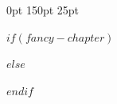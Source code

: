 \usepackage{ragged2e}
\usepackage{quoting}

\newenvironment{raggedrighttitle}[1][3cm]
  {\begin{quoting}[leftmargin=#1,rightmargin=#1]\RaggedRight}
  {\end{quoting}}

\renewcommand{\thesection}{}

\titlespacing*{\chapter}
{0pt}%
{150pt}%
{25pt}%

$if(fancy-chapter)$
  \usepackage[$fancy-chapter$]{fncychap}
$else$
  
$endif$

\makeatletter
\let\fp@chapter\chapter
\renewcommand{\chapter}{\fp@chapterimage\@ifstar{\fp@starchapter}{\@ifnextchar[{\fp@chapter}{\fp@numberedchapter}}}
\newcommand{\fp@starchapter}[1]{\fp@chapter*{#1\fp@subtitleline{#1}}\markboth{#1}{}\gdef\fp@subtitle{}}

\newcommand{\fp@subtitle}{}
\newcommand{\fpsetsubtitle}[1]{\gdef\fp@subtitle{#1}}
\newcommand{\fp@subtitleline}[1]{\ifx\fp@subtitle\@empty\else\if\relax\detokenize{#1}\relax\else\\[6pt]\fi{\normalfont\large\itshape\fp@subtitle}\fi}
\newcommand{\fp@numberedchapter}[1]{%
  \ifx\fp@subtitle\@empty\fp@chapter{#1}\else\fp@chapter[#1]{#1\fp@subtitleline{#1}}\fi
  \gdef\fp@subtitle{}}

